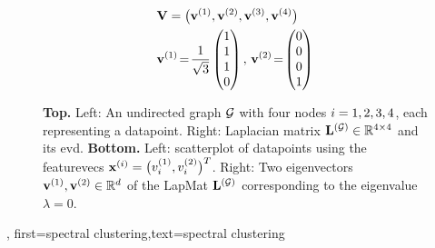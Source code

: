{{\begin{figure}
\begin{center}
\begin{minipage}{0.4\textwidth}
\begin{equation}
						\nonumber
					\end{equation} 
				\end{minipage}
				\vspace*{20mm}\\
				  \begin{minipage}{0.4\textwidth}
				\end{minipage} 
    		\begin{minipage}{0.4\textwidth}
										\begin{align}
											& \mathbf{V} = \big( {\bf v}^{(1)},{\bf v}^{(2)},{\bf v}^{(3)},{\bf v}^{(4)} \big) \nonumber \\
											&	\mathbf{v}^{(1)}\!=\!\frac{1}{\sqrt{3}} \begin{pmatrix} 1 \\ 1 \\ 1 \\ 0 \end{pmatrix}, \,
												\mathbf{v}^{(2)}\!=\!\begin{pmatrix} 0 \\ 0 \\ 0 \\ 1 \end{pmatrix} \nonumber 
												\end{align}
				\end{minipage} 
				\caption{\label{fig_lap_mtx_specclustering} {\bf Top.} Left: An undirected \gls{graph} 
					$\mathcal{G}$ with four nodes $i=1,2,3,4$, each representing a \gls{datapoint}. Right: Laplacian matrix 
					${\bf L}^{(\mathcal{G})}  \in \mathbb{R}^{4 \times 4}$ and its \gls{evd}. 
					{\bf Bottom.} Left: \Gls{scatterplot} of \gls{datapoint}s using the \gls{featurevec}s 
					${\bf x}^{(i)} = \big( v^{(1)}_{i},v^{(2)}_{i} \big)^{T}$. 
					Right: Two \gls{eigenvector}s ${\bf v}^{(1)},{\bf v}^{(2)} \in \mathbb{R}^{d}$ 
					of the \gls{LapMat} ${\bf L}^{(\mathcal{G})}$ corresponding to the \gls{eigenvalue} $\lambda=0$. 
					} 
			\end{center}
		\end{figure}
	\newpage}, 
	first={spectral clustering},text={spectral clustering} 
}

